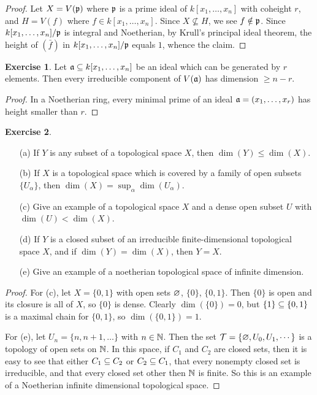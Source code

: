\documentclass[11pt]{book}
\theoremstyle{definition}
\newtheorem{exercise}{Exercise}[section]
\begin{document}
\begin{proof}
Let $X=V(\mathfrak{p})$ where $\mathfrak{p}$ is a prime ideal of $k[x_1,\dots,x_n]$ with coheight $r$, and $H=V(f)$ where $f\in k[x_1,\dots,x_n]$. Since $X\nsubseteq H$, we see $f\notin \mathfrak{p}$. Since $k[x_1,\dots,x_n]/\mathfrak{p}$ is integral and Noetherian, by Krull's principal ideal theorem, the height of $(\bar{f})$ in $k[x_1,\dots,x_n]/\mathfrak{p}$ equals $1$, whence the claim.
\end{proof}
\begin{exercise}
Let $\mathfrak{a}\subseteq k[x_1,\dots,x_n]$ be an ideal which can be generated by $r$ elements. Then every irreducible component of $V(\mathfrak{a})$ has dimension $\geq n-r$.
\end{exercise}
\begin{proof}
In a Noetherian ring, every minimal prime of an ideal $\mathfrak{a}=(x_1,\dots,x_r)$ has height smaller than $r$. 
\end{proof}
\begin{exercise}
\mbox{}
\begin{itemize}
\item[(a)] If $Y$ is any subset of a topological space $X$, then $\dim(Y)\leq\dim(X)$.
\item[(b)] If $X$ is a topological space which is covered by a family of open subsets $\{U_\alpha\}$, then $\dim(X)=\sup_\alpha\dim(U_\alpha)$.
\item[(c)] Give an example of a topological space $X$ and a dense open subset $U$ with $\dim(U)<\dim(X)$.
\item[(d)] If $Y$ is a closed subset of an irreducible finite-dimensional topological space $X$, and if $\dim(Y)=\dim(X)$, then $Y=X$.
\item[(e)] Give an example of a noetherian topological space of infinite dimension. 
\end{itemize}
\end{exercise}
\begin{proof}
For (c), let $X=\{0,1\}$ with open sets $\varnothing$, $\{0\}$, $\{0,1\}$. Then $\{0\}$ is open and its closure is all of $X$, so $\{0\}$ is dense. Clearly $\dim(\{0\})=0$, but $\{1\}\subseteq\{0,1\}$ is a maximal chain for $\{0,1\}$, so $\dim(\{0,1\})=1$.\par
For (e), let $U_n=\{n,n+1,\dots\}$ with $n\in\mathbb{N}$. Then the set $\mathcal{T}=\{\varnothing,U_0,U_1,\cdots\}$ is a topology of open sets on $\mathbb{N}$. In this space, if $C_1$ and $C_2$ are closed sets, then it is easy to see that either $C_1\subseteq C_2$ or $C_2\subseteq C_1$, that every nonempty closed set is irreducible, and that every closed set other then $\mathbb{N}$ is finite. So this is an example of a Noetherian infinite dimensional topological space.
\end{proof}
\end{document}
